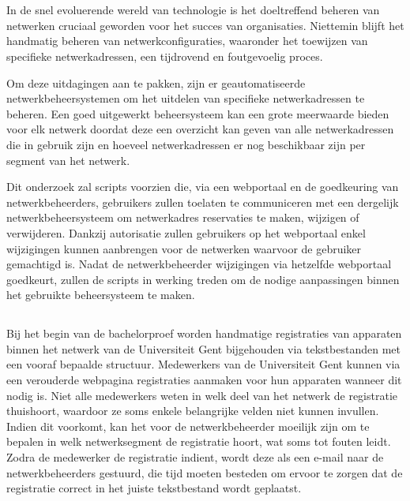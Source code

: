 
\chapter{}%
\label{ch:inleiding}
In de snel evoluerende wereld van technologie is het doeltreffend beheren van netwerken cruciaal geworden voor het succes van organisaties. Niettemin blijft het handmatig beheren van netwerkconfiguraties, waaronder het toewijzen van specifieke netwerkadressen, een tijdrovend en foutgevoelig proces.

Om deze uitdagingen aan te pakken, zijn er geautomatiseerde netwerkbeheersystemen om het uitdelen van specifieke netwerkadressen te beheren. Een goed uitgewerkt beheersysteem kan een grote meerwaarde bieden voor elk netwerk doordat deze een overzicht kan geven van alle netwerkadressen die in gebruik zijn en hoeveel netwerkadressen er nog beschikbaar zijn per segment van het netwerk.

Dit onderzoek zal scripts voorzien die, via een webportaal en de goedkeuring van netwerkbeheerders, gebruikers zullen toelaten te communiceren met een dergelijk netwerkbeheersysteem om netwerkadres reservaties te maken, wijzigen of verwijderen. Dankzij autorisatie zullen gebruikers op het webportaal enkel wijzigingen kunnen aanbrengen voor de netwerken waarvoor de gebruiker gemachtigd is. Nadat de netwerkbeheerder wijzigingen via hetzelfde webportaal goedkeurt, zullen de scripts in werking treden om de nodige aanpassingen binnen het gebruikte beheersysteem te maken.

\section{}%
\label{sec:probleemstelling}
Bij het begin van de bachelorproef worden handmatige registraties van apparaten binnen het netwerk van de Universiteit Gent bijgehouden via tekstbestanden met een vooraf bepaalde structuur. Medewerkers van de Universiteit Gent kunnen via een verouderde webpagina registraties aanmaken voor hun apparaten wanneer dit nodig is. Niet alle medewerkers weten in welk deel van het netwerk de registratie thuishoort, waardoor ze soms enkele belangrijke velden niet kunnen invullen. Indien dit voorkomt, kan het voor de netwerkbeheerder moeilijk zijn om te bepalen in welk netwerksegment de registratie hoort, wat soms tot fouten leidt. Zodra de medewerker de registratie indient, wordt deze als een e-mail naar de netwerkbeheerders gestuurd, die tijd moeten besteden om ervoor te zorgen dat de registratie correct in het juiste tekstbestand wordt geplaatst.

